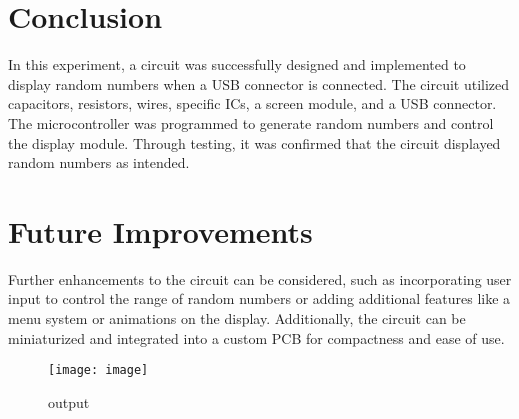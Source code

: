 \documentclass{article}
\begin{document}
\section{Conclusion}
In this experiment, a circuit was successfully designed and implemented to display random numbers when a USB connector is connected. The circuit utilized capacitors, resistors, wires, specific ICs, a screen module, and a USB connector. The microcontroller was programmed to generate random numbers and control the display module. Through testing, it was confirmed that the circuit displayed random numbers as intended.

\section{Future Improvements}
Further enhancements to the circuit can be considered, such as incorporating user input to control the range of random numbers or adding additional features like a menu system or animations on the display. Additionally, the circuit can be miniaturized and integrated into a custom PCB for compactness and ease of use.


\begin{figure}[htbp]
  \centering
  \texttt{[image: image]}
  \caption{output}
  \label{fig:image_label}
\end{figure}
\end{document}
